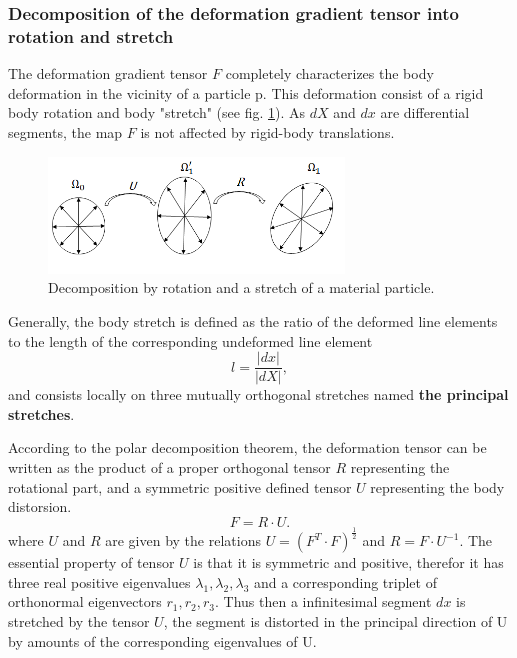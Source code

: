 \subsubsection*{Decomposition of the deformation gradient tensor into rotation and stretch}\label{deformationgradienttensor}
The deformation gradient tensor $F$ completely characterizes
the body deformation in the vicinity of a particle p. This deformation consist of a rigid body rotation and body "stretch" (see fig. \ref{deformationGradientDecom}). As $dX$ and $dx$ are differential segments, the map $F$ is not affected by rigid-body translations.  

\begin{figure}
\begin{center}
\includegraphics[width=0.7\textwidth,keepaspectratio]{figures/deformationTensorDecomposition.png} 
\caption[]{Decomposition by rotation and a stretch of a material particle.  }
\label{deformationGradientDecom}
\end{center}
\end{figure}


Generally, the body stretch is defined as the ratio of the deformed line elements to the length of the corresponding undeformed line element 
\begin{equation}
l = \frac{\vert dx \vert}{\vert dX \vert},
\end{equation} 
and consists locally on three mutually orthogonal stretches named \textbf{the principal stretches}.

According to the polar decomposition theorem, the deformation tensor can be written as the product of a proper orthogonal tensor $R$ representing the rotational part, and a symmetric positive defined tensor $U$ representing the body distorsion. 
\begin{equation}
F = R \cdot U.
\end{equation}
where $U$ and $R$ are given by the relations $U = (F^T \cdot F)^ {\frac{1}{2}} $ and $R = F \cdot U^{-1}$. The essential property of tensor $U$ is that it is symmetric and positive, therefor it has three real positive eigenvalues
$\lambda_1, \lambda_2, \lambda_3$ and a corresponding triplet of orthonormal eigenvectors $r_1, r_2, r_3$. Thus then a infinitesimal segment $dx$ is stretched by the tensor $U$, the segment is distorted in the principal direction of U by amounts of the corresponding eigenvalues of U. 

